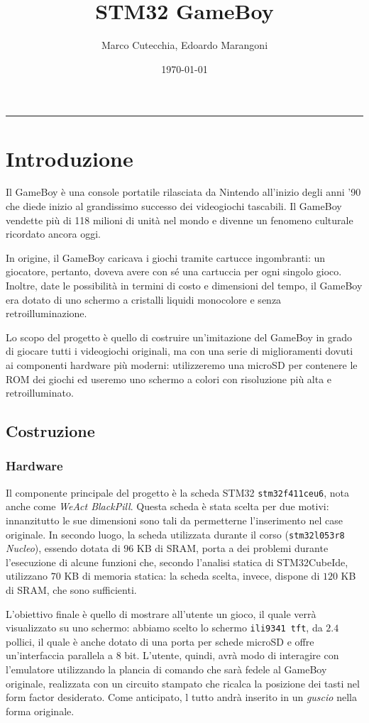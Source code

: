 \documentclass[12pt]{article}
\title{STM32 GameBoy}
\date{\today}
\author{Marco Cutecchia, Edoardo Marangoni}
\begin{document}
\maketitle
\begin{center}\rule{0.5\linewidth}{0.5pt}\end{center}

\section{Introduzione}
Il GameBoy è una console portatile rilasciata da Nintendo all'inizio degli anni
'90 che diede inizio al grandissimo successo dei videogiochi tascabili. Il
GameBoy vendette più di 118 milioni di unità nel mondo e divenne un fenomeno
culturale ricordato ancora oggi.

In origine, il GameBoy caricava i giochi tramite cartucce ingombranti: un
giocatore, pertanto, doveva avere con sé una cartuccia per ogni singolo gioco.
Inoltre, date le possibilità in termini di costo e dimensioni del tempo, il
GameBoy era dotato di uno schermo a cristalli liquidi monocolore e senza
retroilluminazione. 

Lo scopo del progetto è quello di costruire un'imitazione del GameBoy in grado
di giocare tutti i videogiochi originali, ma con una serie di miglioramenti
dovuti ai componenti hardware più moderni: utilizzeremo una microSD per
contenere le ROM dei giochi ed useremo uno schermo a colori con risoluzione più
alta e retroilluminato.

\subsection{Costruzione}
\subsubsection{Hardware}
Il componente principale del progetto è la scheda STM32 \texttt{stm32f411ceu6},
nota anche come \emph{WeAct BlackPill}. Questa scheda è stata scelta per due
motivi: innanzitutto le sue dimensioni sono tali da permetterne l'inserimento
nel case originale. In secondo luogo, la scheda utilizzata durante il corso
(\texttt{stm32l053r8} \textit{Nucleo}), essendo dotata di $96$ KB di SRAM,
porta a dei problemi durante l'esecuzione di alcune funzioni che, secondo
l'analisi statica di STM32CubeIde, utilizzano $70$ KB di memoria statica: la
scheda scelta, invece, dispone di $120$ KB di SRAM, che sono sufficienti.

L'obiettivo finale è quello di mostrare all'utente un gioco, il quale verrà
visualizzato su uno schermo: abbiamo scelto lo schermo \texttt{ili9341 tft}, da
$2.4$ pollici, il quale è anche dotato di una porta per schede microSD e offre
un'interfaccia parallela a $8$ bit. L'utente, quindi, avrà modo di interagire
con l'emulatore utilizzando la plancia di comando che sarà fedele al GameBoy
originale, realizzata con un circuito stampato che ricalca la posizione dei
tasti nel form factor desiderato. Come anticipato, l tutto andrà inserito in un
\emph{guscio} nella forma originale.
\end{document}

